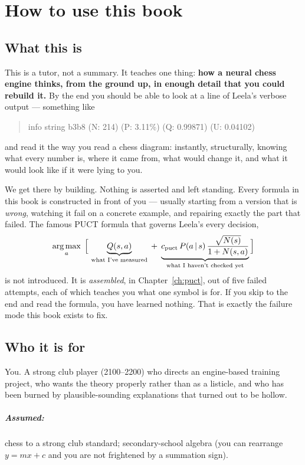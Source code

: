 \chapter*{How to use this book}

\section*{What this is}

This is a tutor, not a summary. It teaches one thing: \textbf{how a neural chess engine
thinks, from the ground up, in enough detail that you could rebuild it.} By the end you
should be able to look at a line of Leela's verbose output --- something like
\begin{quote}\small\ttfamily
info string b3b8 (N: 214) (P: 3.11\%) (Q: 0.99871) (U: 0.04102)
\end{quote}
and read it the way you read a chess diagram: instantly, structurally, knowing what every
number is, where it came from, what would change it, and what it would look like if it
were lying to you.

We get there by building. Nothing is asserted and left standing. Every formula in this book
is constructed in front of you --- usually starting from a version that is \emph{wrong},
watching it fail on a concrete example, and repairing exactly the part that failed. The
famous PUCT formula that governs Leela's every decision,
\[
  \operatorname*{arg\,max}_a\;\Big[\,\underbrace{Q(s,a)}_{\text{what I've measured}}
  \;+\; \underbrace{c_{\text{puct}}\,P(a\,|\, s)\,\frac{\sqrt{N(s)}}{1+N(s,a)}}_{\text{what I haven't checked yet}}\Big]
\]
is not introduced. It is \emph{assembled}, in Chapter~\ref{ch:puct}, out of five failed
attempts, each of which teaches you what one symbol is for. If you skip to the end and
read the formula, you have learned nothing. That is exactly the failure mode this book
exists to fix.

\section*{Who it is for}

You. A strong club player (2100--2200) who directs an engine-based training project, who
wants the theory properly rather than as a listicle, and who has been burned by
plausible-sounding explanations that turned out to be hollow.

\paragraph{Assumed:} chess to a strong club standard; secondary-school algebra (you can
rearrange $y = mx + c$ and you are not frightened by a summation sign).


